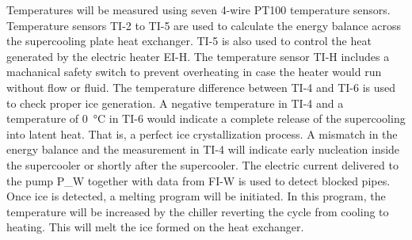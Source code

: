 \documentclass[english]{SFOEYearlyReportEnglish_2018}
\begin{document}
Temperatures will be measured using seven 4-wire PT100 temperature sensors. Temperature sensors TI-2 to TI-5 are used to calculate the energy balance across the supercooling plate heat exchanger. TI-5 is also used to control the heat generated by the electric heater EI-H. The temperature sensor TI-H includes a machanical safety switch to prevent overheating in case the heater would run without flow or fluid. The temperature difference between TI-4 and TI-6 is used to check proper ice generation. A negative temperature in TI-4 and a temperature of \SI{0}{\celsius} in TI-6 would indicate a complete release of the  supercooling into latent heat. That is, a perfect ice crystallization process. A mismatch in the energy balance and the measurement in TI-4 will indicate early nucleation inside the supercooler or shortly after the supercooler. The electric current delivered to the pump  P\_W together with data from FI-W is used to detect blocked pipes. Once ice is detected, a melting program will be initiated. In this program, the temperature will be increased by the chiller reverting the cycle from cooling to heating. This will melt the ice formed on the heat exchanger.
\end{document}
